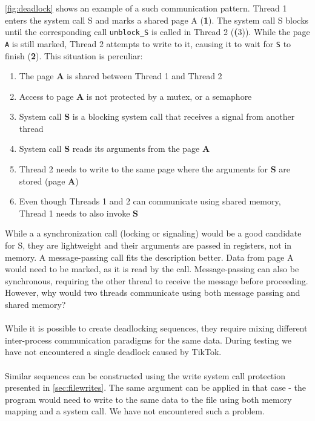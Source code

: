 \cref{fig:deadlock} shows an example of a such communication pattern. Thread 1
enters the system call S and marks a shared page A (\textbf{1}). The system call
S blocks until the corresponding call \texttt{unblock\_S} is called in Thread 2
(\textbf(3)). While the page \texttt{A} is still marked, Thread 2 attempts to 
write to it, causing it to wait for \texttt{S} to finish (\textbf{2}).
This situation is perculiar:
\begin{enumerate}
    \item The page \textbf{A} is shared between Thread 1 and Thread 2
    \item Access to page \textbf{A} is not protected by a mutex, or a semaphore
    \item System call \textbf{S} is a blocking system call that receives a 
    signal from another thread
    \item System call \textbf{S} reads its arguments from the page \textbf{A}
    \item Thread 2 needs to write to the same page where the arguments for 
    \textbf{S} are stored (page \textbf{A})
    \item Even though Threads 1 and 2 can communicate using shared memory, 
    Thread 1 needs to also invoke \textbf{S}
\end{enumerate}

While a a synchronization call (locking or signaling) would be a good candidate
for S, they are lightweight and their arguments are passed in registers, not in
memory. A message-passing call fits the description better. Data from page A 
would need to be marked, as it is read by the call. Message-passing can also be
synchronous, requiring the other thread to receive the message before
proceeding. However, why would two threads communicate using both message
passing and shared memory?
\\
\\
While it is possible to create deadlocking sequences, they require mixing
different inter-process communication paradigms for the same data. During
testing we have not encountered a single deadlock caused by TikTok.
\\
\\
Similar sequences can be constructed using the write system call protection
presented in \cref{sec:filewrites}. The same argument can be applied in that
case - the program would need to write to the same data to the file using both
memory mapping and a system call. We have not encountered such a problem.


